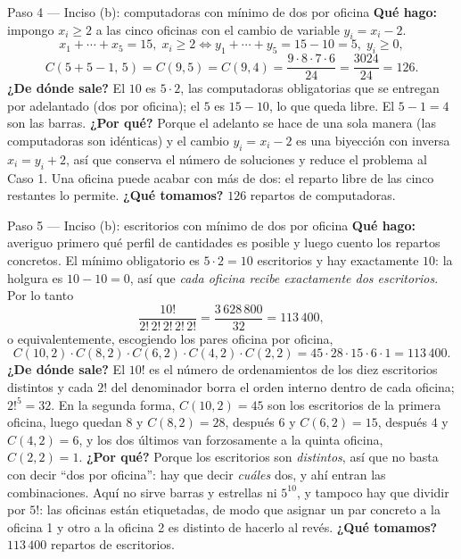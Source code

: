 \documentclass[11pt]{article}
\begin{document}
\begin{paso}{Paso 4 --- Inciso (b): computadoras con mínimo de dos por oficina}
\textbf{Qué hago:} impongo $x_i\ge2$ a las cinco oficinas con el cambio de variable $y_i=x_i-2$.
\[
x_1+\cdots+x_5=15,\;x_i\ge2\iff y_1+\cdots+y_5=15-10=5,\;y_i\ge0,
\]
\[
C(5+5-1,\,5)=C(9,5)=C(9,4)=\frac{9\cdot8\cdot7\cdot6}{24}=\frac{3024}{24}=126 .
\]
\textbf{¿De dónde sale?} El $10$ es $5\cdot 2$, las computadoras obligatorias que se entregan por adelantado (dos por oficina); el $5$ es $15-10$, lo que queda libre. El $5-1=4$ son las barras.
\textbf{¿Por qué?} Porque el adelanto se hace de una sola manera (las computadoras son idénticas) y el cambio $y_i=x_i-2$ es una biyección con inversa $x_i=y_i+2$, así que conserva el número de soluciones y reduce el problema al Caso 1. Una oficina puede acabar con más de dos: el reparto libre de las cinco restantes lo permite.
\textbf{¿Qué tomamos?} $126$ repartos de computadoras.
\end{paso}

\begin{paso}{Paso 5 --- Inciso (b): escritorios con mínimo de dos por oficina}
\textbf{Qué hago:} averiguo primero qué perfil de cantidades es posible y luego cuento los repartos concretos.
El mínimo obligatorio es $5\cdot 2=10$ escritorios y hay exactamente $10$: la holgura es $10-10=0$, así que \emph{cada oficina recibe exactamente dos escritorios}. Por lo tanto
\[
\frac{10!}{2!\,2!\,2!\,2!\,2!}=\frac{3\,628\,800}{32}=113\,400 ,
\]
o equivalentemente, escogiendo los pares oficina por oficina,
\[
C(10,2)\cdot C(8,2)\cdot C(6,2)\cdot C(4,2)\cdot C(2,2)=45\cdot 28\cdot 15\cdot 6\cdot 1=113\,400 .
\]
\textbf{¿De dónde sale?} El $10!$ es el número de ordenamientos de los diez escritorios distintos y cada $2!$ del denominador borra el orden interno dentro de cada oficina; $2!^5=32$. En la segunda forma, $C(10,2)=45$ son los escritorios de la primera oficina, luego quedan $8$ y $C(8,2)=28$, después $6$ y $C(6,2)=15$, después $4$ y $C(4,2)=6$, y los dos últimos van forzosamente a la quinta oficina, $C(2,2)=1$.
\textbf{¿Por qué?} Porque los escritorios son \emph{distintos}, así que no basta con decir ``dos por oficina'': hay que decir \emph{cuáles} dos, y ahí entran las combinaciones. Aquí no sirve barras y estrellas ni $5^{10}$, y tampoco hay que dividir por $5!$: las oficinas están etiquetadas, de modo que asignar un par concreto a la oficina 1 y otro a la oficina 2 es distinto de hacerlo al revés.
\textbf{¿Qué tomamos?} $113\,400$ repartos de escritorios.
\end{paso}
\end{document}
